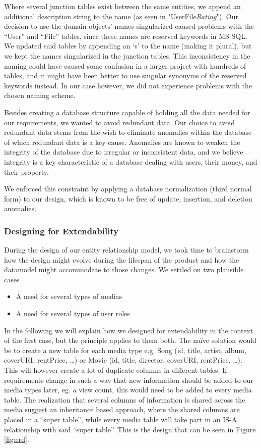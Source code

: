 Where several junction tables exist between the same entities, we append an
additional description string to the name (as seen in
"UserFile\textit{Rating}"). Our decision to use the domain objects' names
singularized caused problems with the “User” and “File” tables, since these
names are reserved keywords in MS SQL. We updated said tables by appending an
‘s’ to the name (making it plural), but we kept the names singularized in the
junction tables. This inconsistency in the naming could have caused some
confusion in a larger project with hundreds of tables, and it might have been
better to use singular synonyms of the reserved keywords instead. In our case
however, we did not experience problems with the chosen naming scheme.

Besides creating a database structure capable of holding all the data needed
for our requirements, we wanted to avoid redundant data. Our choice to avoid
redundant data stems from the wish to eliminate anomalies within the database
of which redundant data is a key cause. Anomalies are known to weaken the
integrity of the database\cite{dbbook} due to irregular or inconsistent data,
and we believe integrity is a key characteristic of a database dealing with
users, their money, and their property.

We enforced this constraint by applying a database normalization (third normal
form) to our design, which is known to be free of update, insertion, and
deletion anomalies.

\subsubsection{Designing for Extendability}
\label{sec:extendability}
During the design of our entity relationship model, we took time to brainstorm how the design might evolve during the lifespan of the product and how the datamodel might accommodate to those changes. We settled on two plausible cases
\begin{itemize}
\item A need for several types of medias
\item A need for several types of user roles
\end{itemize}

In the following we will explain how we designed for extendability in the
context of the first case, but the principle applies to them both. The naïve
solution would be to create a new table for each media type e.g. Song (id,
title, artist, album, coverURI, rentPrice, …) or Movie (id, title, director,
coverURI, rentPrice, …). This will however create a lot of duplicate columns in
different tables. If requirements change in such a way that new information
should be added to our media types later, eg. a view count, this would need to
be added to every media table. The realization that several columns of
information is shared across the media suggest an inheritance based approach,
where the shared columns are placed in a “super table”, while every media table
will take part in an IS-A relationship with said “super table”. This is the
design that can be seen in Figure \ref{fig:erd}.


